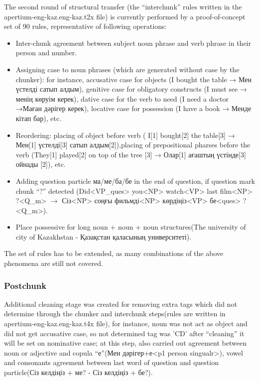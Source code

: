 \documentclass[11pt]{article}
\begin{document}
The second round of structural transfer (the ``interchunk'' rules written in the apertium-eng-kaz.eng-kaz.t2x file) is currently performed by a proof-of-concept set of 90 rules, representative of following operations:
\begin{itemize}
\item Inter-chunk agreement between subject noun phrase and verb phrase in their person and number.
\item Assigning case to noun phrases (which are generated without case by the chunker): for instance, accusative case for objects (I bought the table → Мен үстелді  сатып алдым), genitive case for obligatory constructs (I must see → менің көруім керек),  dative case for the verb to need (I need a doctor →Маған дәрігер керек), locative case for possession (I have a book → Менде кітап бар), etc.
\item Reordering: placing of object before verb ( I[1] bought[2] the table[3] → Мен[1] үстелді[3] сатып алдым[2]),placing of prepositional pharses before the verb  (They[1] played[2] on top of the tree [3] → Олар[1] ағаштың үстінде[3] ойнады [2]), etc.
\item Adding question particle ма/ме/ба/бе in the end of question, if question mark chunk ``?'' detected (Did<VP\_ques> you<NP> watch<VP> last film<NP> ?<Q\_m> $\rightarrow$ Сіз<NP> соңғы фильмді<NP> көрдіңіз<VP> бе<ques> ?<Q\_m>).
\item Place possessive for long noun + noun + noun structures(The university of city of Kazakhstan - Қазақстан  қаласының университеті).
\end{itemize}
The set of rules has to be extended, as many combinations of the above phenomena are still not covered.

\subsubsection{Postchunk}

Additional cleaning stage was created for removing extra tags which did not determine through the chunker and interchunk steps(rules are written in  apertium-eng-kaz.eng-kaz.t4x file), for instance, noun was not act as object and did not get accusative case, so not determined tag was 'CD' after ``cleaning'' it will be set on nominative case; at this step, also carried out agreement between noun or adjective and copula ``е''(Мен дәрігер+е<p1 person singualr>), vowel and consonants agreement between last word of question and question particle(Сіз келдіңіз + ме? - Сіз келдіңіз + бе?).
\end{document}
